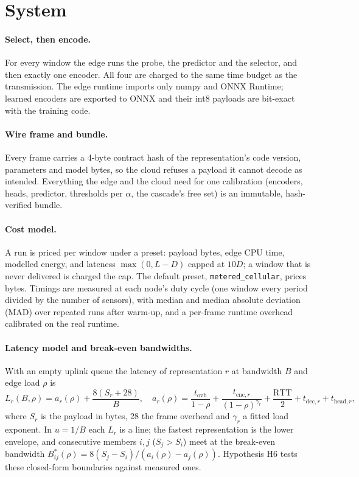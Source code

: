 \section{System}
\label{sec:system}

\paragraph{Select, then encode.} For every window the edge runs the probe, the predictor and the
selector, and then exactly one encoder. All four are charged to the same time budget as the
transmission. The edge runtime imports only numpy and ONNX Runtime; learned encoders are exported
to ONNX and their int8 payloads are bit-exact with the training code.

\paragraph{Wire frame and bundle.} Every frame carries a 4-byte contract hash of the
representation's code version, parameters and model bytes, so the cloud refuses a payload it
cannot decode as intended. Everything the edge and the cloud need for one calibration (encoders,
heads, predictor, thresholds per $\alpha$, the cascade's free set) is an immutable, hash-verified
bundle.

\paragraph{Cost model.} A run is priced per window under a preset: payload bytes, edge CPU time,
modelled energy, and lateness $\max(0, L-D)$ capped at $10D$; a window that is never delivered is
charged the cap. The default preset, \texttt{metered\_cellular}, prices bytes. Timings are measured
at each node's duty cycle (one window every period divided by the number of sensors), with median
and median absolute deviation (MAD) over repeated runs after warm-up, and a per-frame runtime
overhead calibrated on the real runtime.

\paragraph{Latency model and break-even bandwidths.} With an empty uplink queue the latency of
representation $r$ at bandwidth $B$ and edge load $\rho$ is
\begin{equation}
  L_r(B,\rho) = a_r(\rho) + \frac{8(S_r + 28)}{B},\quad
  a_r(\rho) = \frac{t_{\mathrm{ovh}}}{1-\rho} + \frac{t_{\mathrm{enc},r}}{(1-\rho)^{\gamma_r}}
  + \frac{\mathrm{RTT}}{2} + t_{\mathrm{dec},r} + t_{\mathrm{head},r},
  \label{eq:latency}
\end{equation}
where $S_r$ is the payload in bytes, 28 the frame overhead and $\gamma_r$ a fitted load exponent.
In $u = 1/B$ each $L_r$ is a line; the fastest representation is the lower envelope, and
consecutive members $i,j$ ($S_j > S_i$) meet at the break-even bandwidth
$B^*_{ij}(\rho) = 8(S_j - S_i)/(a_i(\rho) - a_j(\rho))$. Hypothesis H6 tests these closed-form
boundaries against measured ones.

